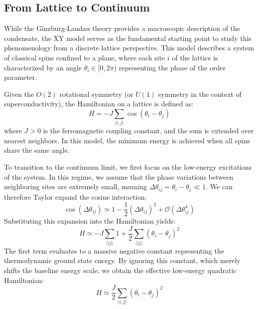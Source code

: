 \documentclass[english,binding=0.6cm,noexaminfo]{sapthesis}
\begin{document}
\subsection{From Lattice to Continuum}
While the Ginzburg-Landau theory provides a macroscopic description of the condensate, the XY model \cite{chaikin1995principles} serves as the fundamental starting point to study this phenomenology from a discrete lattice perspective. This model describes a system of classical spins confined to a plane, where each site $i$ of the lattice is characterized by an angle $\theta_i \in [0, 2\pi)$ representing the phase of the order parameter. 


Given the $O(2)$ rotational symmetry (or $U(1)$ symmetry in the context of superconductivity), the Hamiltonian on a lattice is defined as:
\begin{equation}
    H = -J \sum_{\langle i,j \rangle} \cos(\theta_i - \theta_j)
\end{equation}
where $J > 0$ is the ferromagnetic coupling constant, and the sum is extended over nearest neighbors. In this model, the minimum energy is achieved when all spins share the same angle.

To transition to the continuum limit, we first focus on the low-energy excitations of the system. In this regime, we assume that the phase variations between neighboring sites are extremely small, meaning $\Delta\theta_{ij} = \theta_i - \theta_j \ll 1$. We can therefore Taylor expand the cosine interaction:
\begin{equation}
    \cos(\Delta\theta_{ij}) \simeq 1 - \frac{1}{2}(\Delta\theta_{ij})^2 + \mathcal{O}(\Delta\theta_{ij}^4)
\end{equation}
Substituting this expansion into the Hamiltonian yields:
\begin{equation}
    H \simeq -J \sum_{\langle ij \rangle} 1 + \frac{J}{2} \sum_{\langle ij \rangle} (\theta_i - \theta_j)^2
\end{equation}
The first term evaluates to a massive negative constant representing the thermodynamic ground state energy. By ignoring this constant, which merely shifts the baseline energy scale, we obtain the effective low-energy quadratic Hamiltonian:
\begin{equation}
    H \simeq \frac{J}{2} \sum_{\langle i,j \rangle} (\theta_i - \theta_j)^2
\end{equation}
\end{document}
